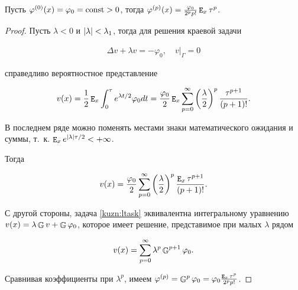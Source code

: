 \begin{lemma}{}

Пусть $\varphi^{(0)}(x)=\varphi_0=\mathop{\rm const}\nolimits>0${\rm ,} тогда $\varphi^{(p)}(x)=\frac{\varphi_0}{2^pp!}\mathop{\tt E}\nolimits_x\tau^p${\rm .}

\end{lemma}



\begin{proof}

    Пусть $\lambda<0$ и $\left|{\lambda}\right|<\lambda_1$, тогда для решения краевой задачи

    \begin{gather}

        \Delta v+\lambda v=-\varphi_0, \quad v\bigr|_\Gamma=0

        \label{kuzn:ltask}

    \end{gather}

    справедливо вероятностное представление

    \[

        v(x)=\frac{1}{2}\expect_x\int_0^\tau e^{\lambda t/2}\varphi_0dt=\frac{\varphi_0}{2}\expect_x\lsum_{p=0}^\infty\left(\frac{\lambda}{2}\right)^p\frac{\tau^{p+1}}{(p+1)!}.

    \]

В последнем ряде можно поменять местами знаки математического ожидания и суммы, т.~к. $\mathop{\tt E}\nolimits_x e^{\left|{\lambda}\right|\tau/2}<+\infty$.

    Тогда

    \[

        v(x)=\frac{\varphi_0}{2}\lsum_{p=0}^\infty\left(\frac{\lambda}{2}\right)^p\frac{\expect_x\tau^{p+1}}{(p+1)!}.

    \]



    С другой стороны, задача \eqref{kuzn:ltask} эквивалентна интегральному уравнению $v(x)=\lambda\mathop{\mathbb{G}}\nolimits v+\mathop{\mathbb{G}}\nolimits \varphi_0$, которое имеет решение, представимое при малых $\lambda$ рядом

    \begin{equation*}

        v(x)=\lsum_{p=0}^{\infty}\lambda^p\IGreen^{p+1}\varphi_0.

    \end{equation*}

Сравнивая коэффициенты при $\lambda^p$, имеем $\varphi^{(p)}=\mathop{\mathbb{G}}\nolimits^p\varphi_0=\varphi_0\frac{\mathop{\tt E}\nolimits_x\tau^p}{2^p p!}$.

\end{proof}



